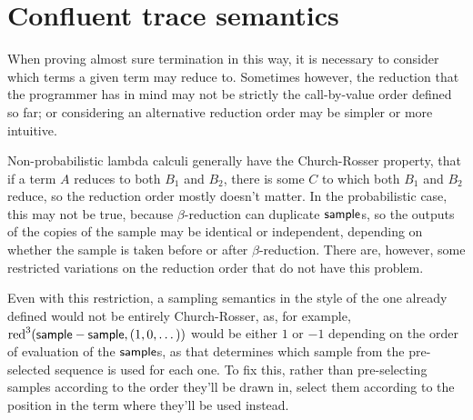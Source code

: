 \section{Confluent trace semantics}
\label{sec:confluent}

When proving almost sure termination in this way, it is necessary to consider which terms a given term may reduce to. Sometimes however, the reduction that the programmer has in mind may not be strictly the call-by-value order defined so far; or considering an alternative reduction order may be simpler or more intuitive.

Non-probabilistic lambda calculi generally have the Church-Rosser property, that if a term $A$ reduces to both $B_1$ and $B_2$, there is some $C$ 
to which both $B_1$ and $B_2$ reduce,
so the reduction order mostly doesn't matter. 
In the probabilistic case, this may not be true, because $\beta$-reduction can duplicate $\mathsf{sample}$s, so the outputs of the copies of the sample may be identical or independent, depending on whether the sample is taken before or after $\beta$-reduction. 
There are, however, some restricted variations on the reduction order that do not have this problem.

\medskip
Even with this restriction, a sampling semantics in the style of the one already defined would not be entirely Church-Rosser, as, for example, $\operatorname{red}^3(\mathsf{sample} - \mathsf{sample}, (1,0,\dots))$ would be either $1$ or $-1$ depending on the order of evaluation of the $\mathsf{sample}$s, as that determines which sample from the pre-selected sequence is used for each one. To fix this, rather than pre-selecting samples according to the order they'll be drawn in, select them according to the position in the term where they'll be used instead.

